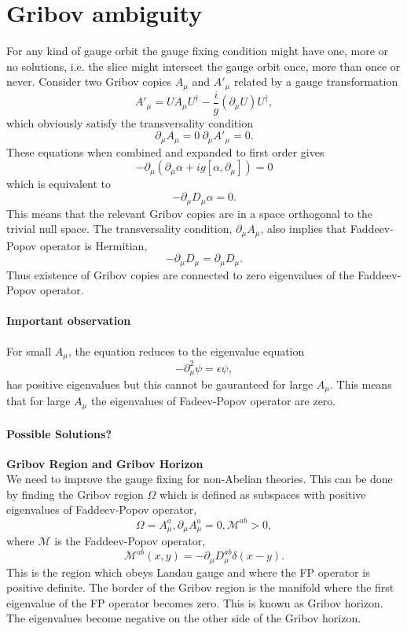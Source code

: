 \section{Gribov ambiguity}

For any kind of gauge orbit the gauge fixing condition might have one, more or no solutions, i.e. the slice might intersect the gauge orbit once, more than once or never. Consider two Gribov copies $A_{\mu}$ and $A'_{\mu}$ related by a gauge transformation $$ A'_{\mu}=U A_{\mu} U^{\dagger}-\frac{i}{g}(\partial_{\mu}U)U^{\dagger},$$ which obviously satisfy the transversality condition $$\partial_{\mu}A_{\mu}=0 \ \partial_{\mu}A'_{\mu}=0. $$ These equations when combined and expanded to first order gives $$ -\partial_{\mu}(\partial_{\mu}\alpha+i g [\alpha,\partial_{\mu}])=0 $$ which is equivalent to $$-\partial_{\mu}D_{\mu} \alpha  =0.$$ This means that the relevant Gribov copies are in a space orthogonal to the trivial null space. The transversality condition, $\partial_{\mu}A_{\mu}$, also implies that Faddeev-Popov operator is Hermitian, $$-\partial_{\mu}D_{\mu}=\partial_{\mu}D_{\mu}.$$ Thus existence of Gribov copies are connected to zero eigenvalues of the Faddeev-Popov operator.

\paragraph{Important observation}
For small $A_{\mu}$, the equation reduces to the eigenvalue equation $$-\partial^{2}_{\mu}\psi=\epsilon \psi,$$ has positive eigenvalues but this cannot be gauranteed for large $A_{\mu}$. This means that for large $A_{\mu}$ the eigenvalues of Fadeev-Popov operator are zero.


\paragraph{Possible Solutions?}
\textbf{Gribov Region and Gribov Horizon}\\
We need to improve the gauge fixing for non-Abelian theories. This can
be done by finding the Gribov region $\Omega$ which is defined as
subspaces with positive eigenvalues of Faddeev-Popov operator, $$\Omega
= {A^{a}_{\mu},\partial_{\mu}A^{a}_{\mu}=0, \mathcal{M}^{ab}>0},$$
where $\mathcal{M}$ is the Faddeev-Popov operator,
$$\mathcal{M}^{ab}(x,y)=-\partial_{\mu}D^{ab}_{\mu}\delta(x-y).$$ This is
the region which obeys Landau gauge and where the FP operator is positive
definite. The border of the Gribov region is the manifold where the first
eigenvalue of the FP operator becomes zero. This is known as Gribov
horizon. The eigenvalues become negative on the other side of the Gribov
horizon.

